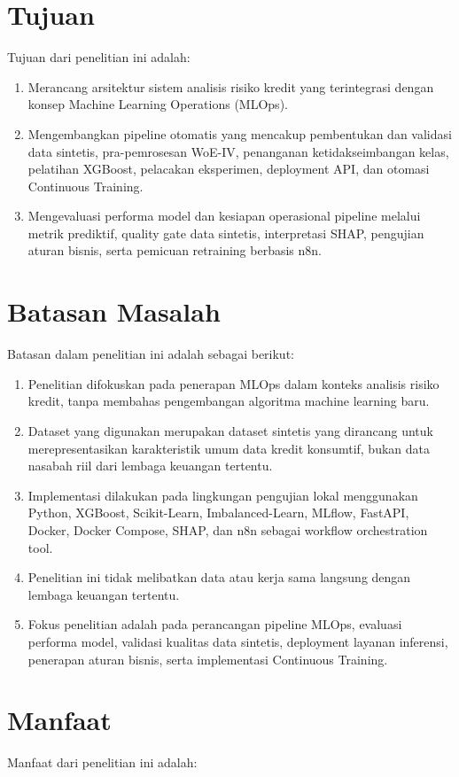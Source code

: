 \section{Tujuan}
Tujuan dari penelitian ini adalah:
\begin{enumerate}
    \item Merancang arsitektur sistem analisis risiko kredit yang terintegrasi dengan konsep Machine Learning Operations (MLOps).
    \item Mengembangkan pipeline otomatis yang mencakup pembentukan dan validasi data sintetis, pra-pemrosesan WoE-IV, penanganan ketidakseimbangan kelas, pelatihan XGBoost, pelacakan eksperimen, deployment API, dan otomasi Continuous Training.
    \item Mengevaluasi performa model dan kesiapan operasional pipeline melalui metrik prediktif, quality gate data sintetis, interpretasi SHAP, pengujian aturan bisnis, serta pemicuan retraining berbasis n8n.
\end{enumerate}
\section{Batasan Masalah}
Batasan dalam penelitian ini adalah sebagai berikut:
\begin{enumerate}
    \item Penelitian difokuskan pada penerapan MLOps dalam konteks analisis risiko kredit, tanpa membahas pengembangan algoritma machine learning baru.
    \item Dataset yang digunakan merupakan dataset sintetis yang dirancang untuk merepresentasikan karakteristik umum data kredit konsumtif, bukan data nasabah riil dari lembaga keuangan tertentu.
    \item Implementasi dilakukan pada lingkungan pengujian lokal menggunakan Python, XGBoost, Scikit-Learn, Imbalanced-Learn, MLflow, FastAPI, Docker, Docker Compose, SHAP, dan n8n sebagai workflow orchestration tool.
    \item Penelitian ini tidak melibatkan data atau kerja sama langsung dengan lembaga keuangan tertentu.
    \item Fokus penelitian adalah pada perancangan pipeline MLOps, evaluasi performa model, validasi kualitas data sintetis, deployment layanan inferensi, penerapan aturan bisnis, serta implementasi Continuous Training.
\end{enumerate}

\section{Manfaat}
Manfaat dari penelitian ini adalah:
